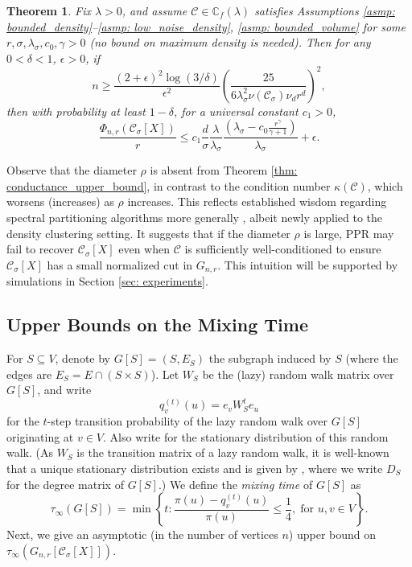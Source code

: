 \documentclass[11pt,twoside]{article}
\newtheorem{theorem}{Theorem}
\newcommand{\set}[1]{\left\{#1\right\}}
\newcommand{\vol}{\mathrm{vol}}
\newcommand{\1}{\mathbf{1}}
\newcommand{\Xbf}{X}             %
\newcommand{\Wbf}{W}
\newcommand{\Dbf}{D}
\newcommand{\Cbb}{\mathbb{C}}
\newcommand{\Cset}{\mathcal{C}}
\newcommand{\Csig}{\Cset_{\sigma}}
\begin{document}
\begin{theorem}
  \label{thm: conductance_upper_bound}
  Fix $\lambda > 0$, and assume $\Cset \in \Cbb_f(\lambda)$ satisfies
  Assumptions \ref{asmp: bounded_density}--\ref{asmp: low_noise_density}, 
  \ref{asmp: bounded_volume} for some $r, \sigma, \lambda_{\sigma}, c_0, \gamma
  > 0$ (no bound on maximum density is needed). Then for any $0 < \delta < 1$,
  $\epsilon > 0$, if 
  \begin{equation}
    \label{eqn: conductance_sample_complexity}
    n \geq \frac{(2+\epsilon)^2\log(3/\delta)}{\epsilon^2}\left(\frac{25}
      {6 \lambda_{\sigma}^2\nu(\Csig) \nu_d r^d}\right)^2,
  \end{equation}
  then with probability at least $1-\delta$, for a universal constant $c_1 > 0$,
  \begin{equation}
    \label{eqn: conductance_additive_error_bound}
    \frac{\Phi_{n,r}(\Csig[\Xbf])}{r} \leq c_1 \frac{d}{\sigma}
    \frac{\lambda}{\lambda_{\sigma}} \frac{(\lambda_{\sigma} -
      c_0\frac{r^{\gamma}}{\gamma+1})}{\lambda_{\sigma}} + \epsilon.
  \end{equation}
\end{theorem}
Observe that the diameter $\rho$ is absent from Theorem \ref{thm:
    conductance_upper_bound}, in contrast to the condition number
  $\kappa(\Cset)$, which worsens (increases) as $\rho$ increases. This
  reflects established wisdom regarding spectral partitioning
  algorithms more generally \citep{guattery1995, hein2010}, albeit newly applied
  to the density clustering setting. It suggests that if the diameter $\rho$ is
  large, PPR may fail to recover $\Csig[\Xbf]$ even when $\Cset$ is
  sufficiently well-conditioned to ensure $\Csig[\Xbf]$ has a small normalized
  cut in $G_{n,r}$. This intuition will be supported by simulations in Section
  \ref{sec: experiments}. 

\subsection{Upper Bounds on the Mixing Time} 
For $S \subseteq V$, denote by $G[S] = (S, E_S)$ the
subgraph induced by $S$ (where the edges are $E_S = E \cap (S \times S)$). Let
$\Wbf_S$ be the (lazy) random walk matrix over $G[S]$, and write  
$$
q_{v}^{(t)}(u) = e_v\Wbf_S^t e_u
$$
for the $t$-step transition probability of the lazy random walk over $G[S]$
originating at $v \in V$. Also write 
for the stationary distribution of this random walk.  (As
$\Wbf_S$ is the transition matrix of a lazy random walk, 
it is well-known that a unique stationary distribution exists and is given by 
\smash{$\pi(u) = (\Dbf_S)_{uu}/\vol(S; G[S])$}, where we write $\Dbf_S$ for the  
degree matrix of $G[S]$.) We define the \emph{mixing time} of $G[S]$ as
\begin{equation}
\label{eqn: mixing_time}
\tau_{\infty}(G[S]) = \min\set{ t: \frac{\pi(u) - q_{v}^{(t)}(u)}
  {\pi(u)} \leq \frac{1}{4}, \; \text{for $u,v \in V$}}. 
\end{equation}
Next, we give an asymptotic (in the number of vertices $n$) upper bound on
$\tau_{\infty}(G_{n,r}[\Csig[\Xbf]])$.  
\end{document}
